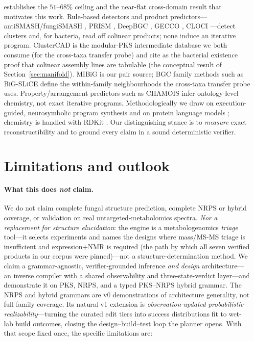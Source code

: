 \documentclass[11pt]{article}
\theoremstyle{definition}
\begin{document}
\citet{riedling2024} establishes the $51$--$68\%$ ceiling and the near-flat cross-domain result
that motivates this work. Rule-based detectors and product predictors---antiSMASH/fungiSMASH
\citep{antismash}, PRISM \citep{prism}, DeepBGC \citep{deepbgc}, GECCO \citep{gecco}, CLOCI
\citep{cloci}---detect clusters and, for bacteria, read off colinear products; none induce an
iterative program. ClusterCAD \citep{clustercad,clustercad2} is the modular-PKS intermediate
database we both consume (for the cross-taxa transfer probe) and cite as the bacterial existence proof
that colinear assembly lines are tabulable (the conceptual result of Section~\ref{sec:manifold}).
MIBiG \citep{mibig} is our pair source; BGC family methods such as BiG-SLiCE
\citep{bigslice} define the within-family neighbourhoods the cross-taxa transfer probe uses.
Property/arrangement predictors such as CHAMOIS \citep{chamois} infer ontology-level chemistry,
not exact iterative programs. Methodologically we draw on execution-guided, neurosymbolic
program synthesis \citep{dreamcoder} and on protein language models \citep{esm2}; chemistry is
handled with RDKit \citep{rdkit}. Our distinguishing stance is to \emph{measure} exact
reconstructibility and to ground every claim in a sound deterministic verifier.

\section{Limitations and outlook}
\label{sec:limits}

\paragraph{What this does \emph{not} claim.} We do not claim complete fungal structure prediction,
complete NRPS or hybrid coverage, or validation on real untargeted-metabolomics spectra. \emph{Nor a
replacement for structure elucidation}: the engine is a metabologenomics \emph{triage} tool---it
selects experiments and names the designs where mass/MS-MS triage is insufficient and
expression$+$NMR is required (the path by which all seven verified products in our corpus were
pinned)---not a structure-determination method. We claim a grammar-agnostic, verifier-grounded
inference \emph{and design} architecture---an inverse compiler with a shared observability and
three-state-verdict layer---and demonstrate it on PKS, NRPS, and a typed PKS--NRPS hybrid grammar. The
NRPS and hybrid grammars are v0 demonstrations of architecture generality, not full family coverage.
Its natural v1 extension is \emph{observation-updated probabilistic realizability}---turning the
curated edit tiers into success distributions fit to wet-lab build outcomes, closing the
design--build--test loop the planner opens. With that scope fixed once, the specific limitations are:
\end{document}
